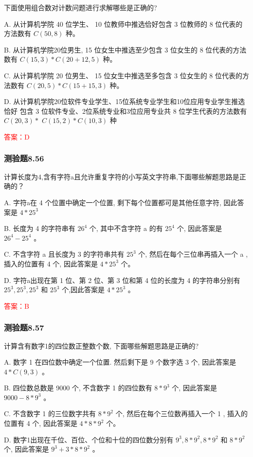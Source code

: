 \documentclass[UTF8, heading=true]{ctexart}
\begin{document}
下面使用组合数对计数问题进行求解哪些是正确的?

A. 从计算机学院 40 位学生、 10 位教师中推选佮好包含 3 位教师的 8 位代表的方法数有 $C(50,8)$ 种。

B. 从计算机学院20位男生, 15 位女生中推选至少包含 3 位女生的 8 位代表的方法数有 $C(15,3) * C(20+12,5)$ 种。

C. 从计算机学院 20 位男生、 15 位女生中推选至多包含 3 位女生的 8 位代表的方法数有 $C(20,5) * C(15+15,3)$ 种。

D. 从计算机学院20位软件专业学生、15位系统专业学生和10位应用专业学生推选恰好
包含 3 位软件专业、2位系统专业和3位应用专业共 8 位学生代表的方法数有 $C(20,3) *$ $C(15,2) * C(10,3)$ 种

\textcolor{red}{答案：D}

\subsubsection{测验题8.56}

计算长度为4,含有字符a且允许重复字符的小写英文字符串,下面哪些解题思路是正确的？

A. 字符a在 4 个位置中确定一个位置, 剩下每个位置都可是其他任意字符, 因此答案是 $4 * 25^3$ 

B. 长度为 4 的字符串有 $26^4$ 个, 其中不含字符 a 的有 $25^4$ 个, 因此答案是 $26^4-25^4$ 。

C. 不含字符 a 且长度为 3 的字符串共有 $25^3$ 个, 然后在每个三位串再插入一个 a , 插入的位置有 4 个, 因此答案是 $4 * 25^3$ 个。

D. 字符a出现在第 1 位、第 2 位、第 3 位和第 4 位的长度为 4 的字符串分别有 $25^3, 25^3, 25^3$ 和 $25^3$ 个,因此答案是 $4 * 25^3$ 。

\textcolor{red}{答案：B}

\subsubsection{测验题8.57}
计算含有数字1的四位数正整数个数, 下面哪些解题思路是正确的?

A. 数字 1 在四位数中确定一个位置. 然后剩下是 9 个数字选 3 个, 因此答案是 $4 * C(9,3)$ 。

B. 四位数总数是 9000 个, 不含数字 1 的四位数有 $8 * 9^3$ 个, 因此答案是 $9000-8 * 9^3$ 。

C. 不含数字 1 的三位数字共有 $8 * 9^2$ 个, 然后在每个三位数再插入一个 1 , 插入的位置有 4 个, 因此答案是 $4 * 8 * 9^2$ 个。

D. 数字1出现在千位、百位、个位和十位的四位数分别有 $9^3, 8 * 9^2, 8 * 9^2$ 和 $8 * 9^2$ 个, 因此答案是 $9^3+3 * 8 * 9^2$ 。
\end{document}
